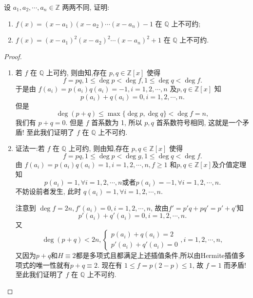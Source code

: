 \documentclass[../../main.tex]{subfiles}
\begin{document}
\begin{example}
设 \( a_1,a_2,\cdots,a_n \in \mathbb{Z} \) 两两不同, 证明:
\begin{enumerate}
\item \( f(x) = (x - a_1)(x - a_2)\cdots(x - a_n) - 1 \) 在 \( \mathbb{Q} \) 上不可约;

\item \( f(x) = (x - a_1)^2(x - a_2)^2\cdots(x - a_n)^2 + 1 \) 在 \( \mathbb{Q} \) 上不可约.
\end{enumerate}
\end{example}
\begin{proof}
\begin{enumerate}
\item 若 \( f \) 在 \( \mathbb{Q} \) 上可约, 则由知,存在 \( p,q \in \mathbb{Z}[x] \) 使得
\[
f = pq, 1 \leq \deg p < \deg f, 1 \leq \deg q < \deg f.
\]
于是由 \( f(a_i) = p(a_i)q(a_i) = -1, i = 1,2,\cdots,n \) 及\( p,q \in \mathbb{Z}[x] \) 知
\[
p(a_i) + q(a_i) = 0, i = 1,2,\cdots,n.
\]
但是
\[
\deg(p + q) \leq \max\{\deg p, \deg q\} < \deg f = n,
\]
我们有 \( p + q = 0 \). 但是 \( f \) 首系数为 1, 所以 \( p,q \) 首系数符号相同, 这就是一个矛盾! 至此我们证明了 \( f \) 在 \( \mathbb{Q} \) 上不可约.

\item {\color{blue}证法一:}若 \( f \) 在 \( \mathbb{Q} \) 上可约, 则由知,存在 \( p,q \in \mathbb{Z}[x] \) 使得
\[
f = pq, 1 \leq \deg p < \deg g, 1 \leq \deg q < \deg f.
\]
由 \( f(a_i) = p(a_i)q(a_i) = 1, i = 1,2,\cdots,n, f \geq 1 \) 和\( p,q \in \mathbb{Z}[x] \)及介值定理知
\[
p(a_i) = 1, \forall i = 1,2,\cdots,n \text{或者} p(a_i) = -1, \forall i = 1,2,\cdots,n.
\]
不妨设前者发生, 此时 \( q(a_i) = 1, \forall i = 1,2,\cdots,n \).

注意到 \( \deg f = 2n, f'(a_i) = 0, i = 1,2,\cdots,n \), 故由$f'=p'q+pq'=p'+q'$知
\[p'(a_i) + q'(a_i) = 0, i = 1,2,\cdots,n .\] 又
\[
\deg(p + q) < 2n, \begin{cases} p(a_i) + q(a_i) = 2 \\ p'(a_i) + q'(a_i) = 0 \end{cases}, i = 1,2,\cdots,n,
\]
又因为$p+q$和$H\equiv 2$都是多项式且都满足上述插值条件,所以由Hermite插值多项式的唯一性就有\( p + q \equiv 2 \). 现在有 \( 1 \leq f = p(2 - p) \leq 1 \), 故 \( f = 1 \) 而矛盾! 至此我们证明了 \( f \) 在 \( \mathbb{Q} \) 上不可约.


\end{enumerate}
\end{proof}
\end{document}
